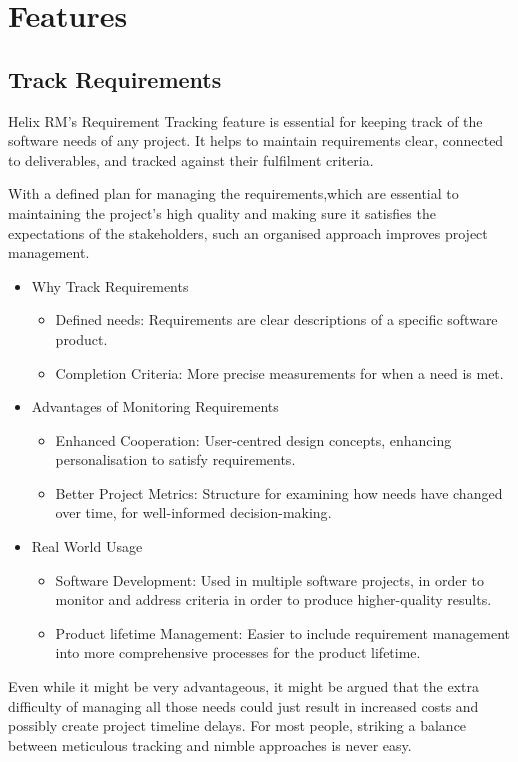 \section{Features}

\subsection{Track Requirements}

Helix RM's Requirement Tracking feature is essential for keeping
track of the software needs of any project.
It helps to maintain requirements clear, connected to
deliverables, and tracked against their fulfilment criteria.

With a defined plan for managing the requirements,which
are essential to maintaining the project's high quality and
making sure it satisfies the expectations of the stakeholders,
such an organised approach improves project management.

\begin{itemize}
    \item Why Track Requirements
    \begin{itemize}
        \item Defined needs: Requirements are clear descriptions of a specific software product\cite{b1}.
        \item Completion Criteria: More precise measurements for when a need is met\cite{b2}.
    \end{itemize}

    \item Advantages of Monitoring Requirements
    \begin{itemize}
        \item Enhanced Cooperation: User-centred design concepts, enhancing personalisation to satisfy requirements\cite{b3}.
        \item Better Project Metrics: Structure for examining how needs have changed over time, for well-informed decision-making\cite{b2}.
    \end{itemize}

    \item Real World Usage
    \begin{itemize}
        \item Software Development: Used in multiple software projects, in order to monitor and address criteria in order to produce higher-quality results\cite{b4}.
        \item Product lifetime Management: Easier to include requirement management into more comprehensive processes for the product lifetime\cite{b3}.
    \end{itemize}
\end{itemize}

Even while it might be very advantageous, it might be
argued that the extra difficulty of managing all those needs
could just result in increased costs and possibly create project
timeline delays.
For most people, striking a balance between meticulous
tracking and nimble approaches is never easy.

